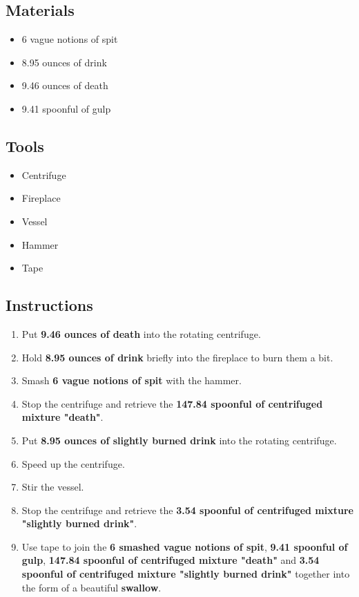 \documentclass{article}
\begin{document}
\subsection{Materials}\begin{itemize}
\item 
6 vague notions of spit
\item 
8.95 ounces of drink
\item 
9.46 ounces of death
\item 
9.41 spoonful of gulp
\end{itemize}
\subsection{Tools}\begin{itemize}
\item 
Centrifuge
\item 
Fireplace
\item 
Vessel
\item 
Hammer
\item 
Tape
\end{itemize}
\subsection{Instructions}\begin{enumerate}
\item 
Put \textbf{9.46 ounces of death} into the rotating centrifuge.
\item 
Hold \textbf{8.95 ounces of drink} briefly into the fireplace to burn them a bit.
\item 
Smash \textbf{6 vague notions of spit} with the hammer.
\item 
Stop the centrifuge and retrieve the \textbf{147.84 spoonful of centrifuged mixture "death"}.
\item 
Put \textbf{8.95 ounces of slightly burned drink} into the rotating centrifuge.
\item 
Speed up the centrifuge.
\item 
Stir the vessel.
\item 
Stop the centrifuge and retrieve the \textbf{3.54 spoonful of centrifuged mixture "slightly burned drink"}.
\item 
Use tape to join the \textbf{6 smashed vague notions of spit}, \textbf{9.41 spoonful of gulp}, \textbf{147.84 spoonful of centrifuged mixture "death"} and \textbf{3.54 spoonful of centrifuged mixture "slightly burned drink"} together into the form of a beautiful \textbf{swallow}.
\end{enumerate}
\newpage
\end{document}
